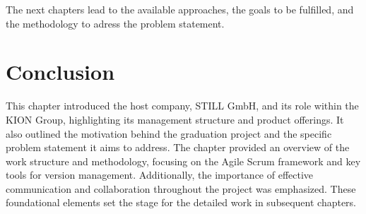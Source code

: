 The next chapters lead to the available approaches, the goals to be fulfilled, and the methodology to adress
the problem statement.


\section*{Conclusion}
This chapter introduced the host company, STILL GmbH, and its role within the KION Group, highlighting its 
management structure and product offerings. It also outlined the motivation behind the graduation project 
and the specific problem statement it aims to address. The chapter provided an overview of the work structure 
and methodology, focusing on the Agile Scrum framework and key tools for version management. Additionally, 
the importance of effective communication and collaboration throughout the project was emphasized. These 
foundational elements set the stage for the detailed work in subsequent chapters.